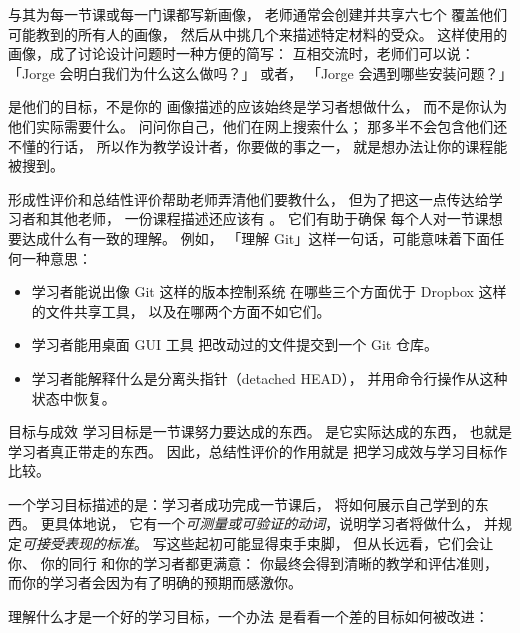 与其为每一节课或每一门课都写新画像，
老师通常会创建并共享六七个
覆盖他们可能教到的所有人的画像，
然后从中挑几个来描述特定材料的受众。
这样使用的画像，成了讨论设计问题时一种方便的简写：
互相交流时，老师们可以说：
「Jorge 会明白我们为什么这么做吗？」
或者，
「Jorge 会遇到哪些安装问题？」

\begin{aside}{是他们的目标，不是你的}
  画像描述的应该始终是学习者想做什么，
  而不是你认为他们实际需要什么。
  问问你自己，他们在网上搜索什么；
  那多半不会包含他们还不懂的行话，
  所以作为教学设计者，你要做的事之一，
  就是想办法让你的课程能被搜到。
\end{aside}


形成性评价和总结性评价帮助老师弄清他们要教什么，
但为了把这一点传达给学习者和其他老师，
一份课程描述还应该有
。
它们有助于确保
每个人对一节课想要达成什么有一致的理解。
例如，
「理解 Git」这样一句话，可能意味着下面任何一种意思：

\begin{itemize}

\item
  学习者能说出像 Git 这样的版本控制系统
  在哪些三个方面优于 Dropbox 这样的文件共享工具，
  以及在哪两个方面不如它们。

\item
  学习者能用桌面 GUI 工具
  把改动过的文件提交到一个 Git 仓库。

\item
  学习者能解释什么是分离头指针（detached HEAD），
  并用命令行操作从这种状态中恢复。

\end{itemize}

\begin{aside}{目标与成效}
  学习目标是一节课努力要达成的东西。
  是它实际达成的东西，
  也就是学习者真正带走的东西。
  因此，总结性评价的作用就是
  把学习成效与学习目标作比较。
\end{aside}

一个学习目标描述的是：学习者成功完成一节课后，
将如何展示自己学到的东西。
更具体地说，
它有一个\emph{可测量或可验证的动词}，说明学习者将做什么，
并规定\emph{可接受表现的标准}。
写这些起初可能显得束手束脚，
但从长远看，它们会让你、
你的同行
和你的学习者都更满意：
你最终会得到清晰的教学和评估准则，
而你的学习者会因为有了明确的预期而感激你。

理解什么才是一个好的学习目标，一个办法
是看看一个差的目标如何被改进：

